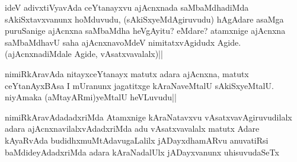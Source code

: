 
\begin{artha}
ideV adivxtiVyavAda ceYtanayxvu ajAcnxnada saMbaMdhadiMda sAkiSxtavxvanunx hoMduvudu, (sAkiSxyeMdAgiruvudu) hAgAdare asaMga puruSanige ajAcnxna saMbaMdha heVgAyitu? eMdare? atamxnige ajAcnxna saMbaMdhavU saha ajAcnxnavoMdeV nimitatxvAgidudx Agide. (ajAcnxnadiMdale Agide, vAsatxvavalalx)||
\end{artha}


\begin{artha}
nimiRkAravAda nitayxceYtanayx matutx adara ajAcnxna, matutx ceYtanAyxBAsa I mUranunx jagatitxge kAraNaveMtalU sAkiSxyeMtalU. niyAmaka (aMtayARmi)yeMtalU heVLuvudu|| 
\end{artha}

\begin{artha}
nimiRkAravAdadadxriMda Atamxnige kAraNatavxvu vAsatxvavAgiruvudilalx adara ajAcnxnavilalxvAdadxriMda adu vAsatxvavalalx matutx Adare kAyaRvAda budidhxmuMtAdavugaLalilx jADayxdhamARvu anuvatiRsi baMdideyAdadxriMda adara kAraNadalUlx jADayxvanunx uhisuvudaSeTx
\end{artha}

\begin{artha}%

\end{artha}
